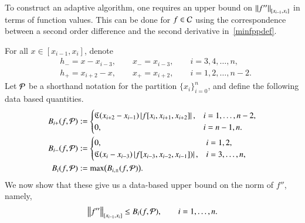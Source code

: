 \documentclass[review]{elsarticle}
\theoremstyle{definition}
\begin{document}
To construct an adaptive algorithm, one requires an upper bound on
$\norm[{[x_{i-1},x_i]}]{f''}$ in terms of function values. This can be done for
$f \in \cc$ using the correspondence between a second order difference and the
second derivative in~\eqref{minfppdef}.

For all $ x \in [x_{i-1},x_i]$,  denote
\begin{align*}
&h_- = x - x_{i-3}, \qquad x_- = x_{i-3},  \qquad i=3,4,\ldots,n,\\
 &h_+ = x_{i+2} - x, \qquad x_+ =  x_{i+2}, \qquad i=1,2,\ldots,n-2.
\end{align*}
Let $\cp$ be a shorthand notation for the partition $\{x_i\}_{i=0}^n$, and define the following data based quantities.
\begin{align}\label{bpf}
B_{i+}(f,\cp)&:=\begin{cases}
    \fC(x_{i+2}-x_{i-1})\abs{f[x_i,x_{i+1},x_{i+2}]},  & i=1,\ldots,n-2,
\\ 0, & i=n-1,n.
\end{cases} \\
\label{bmf}
 B_{i-}(f,\cp)&: =\begin{cases}
   0,  & i=1,2,
\\ \fC(x_{i}-x_{i-3})\abs{f[x_{i-3},x_{i-2},x_{i-1}])}, & i=3,\ldots,n,
\end{cases} \\
\nonumber
B_i(f,\cp) & : = \max\bigl(B_{i,\pm}(f,\cp) \bigr).
\end{align}
We now show that these give us a data-based upper bound on the norm of $f''$, namely,
\begin{equation}\label{normbd}
\norm[{[x_{i-1},x_i]}]{f''} \le B_i(f,\cp), \qquad i =1, \ldots, n.
\end{equation}
\end{document}
